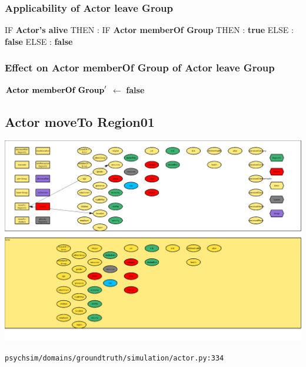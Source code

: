 \documentclass{article}%
\begin{document}
\subsubsection{Applicability of Actor leave Group}%
\label{ssubsec:Applicability of Actor leave Group}%
\begin{flushleft}%
IF %
\textbf{Actor's alive}%
\linebreak%
\hspace*{2em}%
THEN %
: %
IF %
\textbf{Actor memberOf Group}%
\linebreak%
\hspace*{4em}%
THEN %
: %
\textbf{true}%
\linebreak%
\hspace*{4em}%
ELSE %
: %
\textbf{false}%
\linebreak%
\hspace*{2em}%
ELSE %
: %
\textbf{false}%
\end{flushleft}

%
\subsubsection{Effect on Actor memberOf Group of Actor leave Group}%
\label{ssubsec:Effect on Actor memberOf Group of Actor leave Group}%
\begin{flushleft}%
$\mbox{\textbf{Actor memberOf Group}} '$%
$\leftarrow$%
\textbf{false}%
\end{flushleft}

%
\subsection{Actor moveTo Region01}%
\label{subsec:Actor moveTo Region01}%
\includegraphics[width=\textwidth]{images/Actor-moveTo-Region01.png}%
\begin{flushleft}%
\verb|psychsim/domains/groundtruth/simulation/actor.py:334|%
\end{flushleft}%
\end{document}
